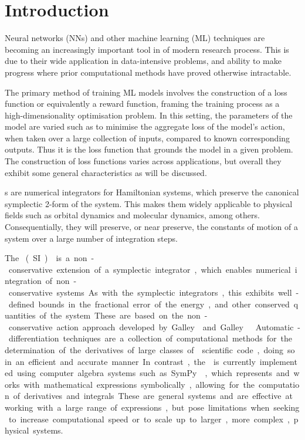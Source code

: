 \section{Introduction}

Neural networks (NNs) and other machine learning (ML) techniques are becoming an increasingly important tool in of modern research process. This is due to their wide application in data-intensive problems, and ability to make progress where prior computational methods have proved otherwise intractable.

The primary method of training ML models involves the construction of a loss function or equivalently a reward function, framing the training process as a high-dimensionality optimisation problem.
In this setting, the parameters of the model are varied such as to minimise the aggregate loss of the model's action, when taken over a large collection of inputs, compared to known corresponding outputs.
Thus it is the loss function that grounds the model in a given problem.
The construction of loss functions varies across applications, but overall they exhibit some general characteristics as will be discussed.

\SymI{}s are numerical integrators for Hamiltonian systems, which preserve the canonical symplectic 2-form of the system. 
This makes them widely applicable to physical fields such as orbital dynamics and molecular dynamics, among others\cite{gladmanSymplecticIntegratorsLongterm1991,wisdomSymplecticMapsNbody1991}. Consequentially, they will preserve, or near preserve, the constants of motion of a system over a large number of integration steps.

The \SI{} (SI)\cite{tsangSLIMPLECTICINTEGRATORSVARIATIONAL2015} is a non-conservative extension of a symplectic integrator, which enables numerical integration of non-conservative systems. As with the symplectic integrators, this exhibits well-defined bounds in the fractional error of the energy, and other conserved quantities of the system. These are based on the non-conservative action approach developed by Galley \cite{galleyClassicalMechanicsNonconservative2013} and Galley \etall \cite{galleyPrincipleStationaryNonconservative2014}.

Automatic-differentiation techniques are a collection of computational methods for the determination of the derivatives of large classes of scientific code, doing so in an efficient and accurate manner. In contrast, the \SI{} is currently implemented using computer algebra systems such as SymPy \cite{sympy}, which represents and works with mathematical expressions symbolically, allowing for the computation of derivatives and integrals. These are general systems and are effective at working with a large range of expressions, but pose limitations when seeking to increase computational speed or to scale up to larger, more complex, physical systems.

